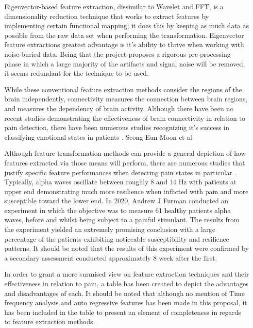 \documentclass[12pt]{article}
\begin{document}
Eigenvector-based feature extraction, dissimilar to Wavelet and FFT, is a dimensionality reduction technique that works to extract features by implementing certain functional mapping; it does this by keeping as much data as possible from the raw data set when performing the transformation. Eigenvector feature extractions greatest advantage is it's ability to thrive when working with noise-buried data. Being that the project proposes a rigorous pre-processing phase in which a large majority of the artifacts and signal noise will be removed, it seems redundant for the technique to be used.

While these conventional feature extraction methods consider the regions of the brain independently, connectivity measures the connection between brain regions, and measures the dependency of brain activity. Although there have been no recent studies demonstrating the effectiveness of brain connectivity in relation to pain detection, there have been numerous studies recognizing it's success in classifying emotional states in patients \cite{MOON202096}. Seong-Eun Moon et al 

Although feature transformation methods can provide a general depiction of how features extracted via those means will perform, there are numerous studies that justify specific feature performances when detecting pain states in particular \cite{10.1093/cercor/bhaa124}. Typically, alpha waves oscillate between roughly 8 and 14 Hz with patients at upper end demonstrating much more resilience when inflicted with pain and more susceptible toward the lower end. In 2020, Andrew J Furman conducted an experiment in which the objective was to measure 61 healthy patients alpha waves, before and whilst being subject to a painful stimulant. The results from the experiment yielded an extremely promising conclusion with a large percentage of the patients exhibiting noticeable susceptibility and resilience patterns. It should be noted that the results of this experiment were confirmed by a secondary assessment conducted approximately 8 week after the first. 

In order to grant a more surmised view on feature extraction techniques and their effectiveness in relation to pain, a table has been created to depict the advantages and disadvantages of each. It should be noted that although no mention of Time frequency analysis and auto regressive features has been made in this proposal, it has been included in the table to present an element of completeness in regards to feature extraction methods.
\end{document}
